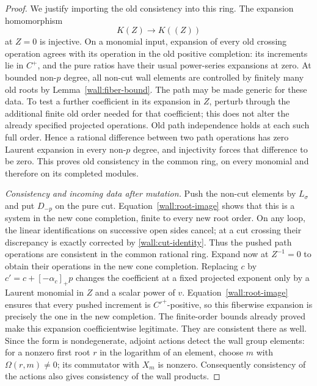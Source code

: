 \begin{proof}
We justify importing the old consistency into this ring.
The expansion homomorphism
\[
 K(Z)\longrightarrow K((Z))
\]
at $Z=0$ is injective.  On a monomial input, expansion of
every old crossing operation agrees with its operation
in the old positive completion: its increments lie in
$C^+$, and the pure ratios have their usual power-series
expansions at zero.  At bounded non-$p$ degree, all
non-cut wall elements are controlled by finitely many
old roots by Lemma~\ref{wall:fiber-bound}.  The path may
be made generic for these data.  To test a further
coefficient in its expansion in $Z$, perturb through
the additional finite old order needed for that
coefficient; this does not alter the already specified
projected operations.  Old path independence holds at
each such full order.  Hence a rational difference
between two path operations has zero Laurent
expansion in every non-$p$ degree, and injectivity
forces that difference to be zero.  This proves old
consistency in the common ring, on every monomial and
therefore on its completed modules.

\emph{Consistency and incoming data after mutation.}
Push the non-cut elements by $L_\sigma$ and put
$D_{-p}$ on the pure cut.  Equation~\eqref{wall:root-image}
shows that this is a system in the new cone completion,
finite to every new root order.  On any loop, the
linear identifications on successive open sides
cancel; at a cut crossing their discrepancy is
exactly corrected by \eqref{wall:cut-identity}.  Thus
the pushed path operations are consistent in the
common rational ring.  Expand now at $Z^{-1}=0$ to
obtain their operations in the new cone completion.
Replacing $c$ by $c'=c+[-\alpha_c]_+p$ changes the
coefficient at a fixed projected exponent only by a
Laurent monomial in $Z$ and a scalar power of $v$.
Equation~\eqref{wall:root-image} ensures that every
pushed increment is $C'^+$-positive, so this fiberwise
expansion is precisely the one in the new completion.
The finite-order bounds already proved make this
expansion coefficientwise legitimate.  They are
consistent there as well.  Since the form is
nondegenerate, adjoint actions detect the wall group
elements: for a nonzero first root $r$ in the
logarithm of an element, choose $m$ with
$\Omega(r,m)\ne0$; its commutator with $X_m$ is
nonzero.  Consequently consistency of the actions
also gives consistency of the wall products.


\end{proof}
